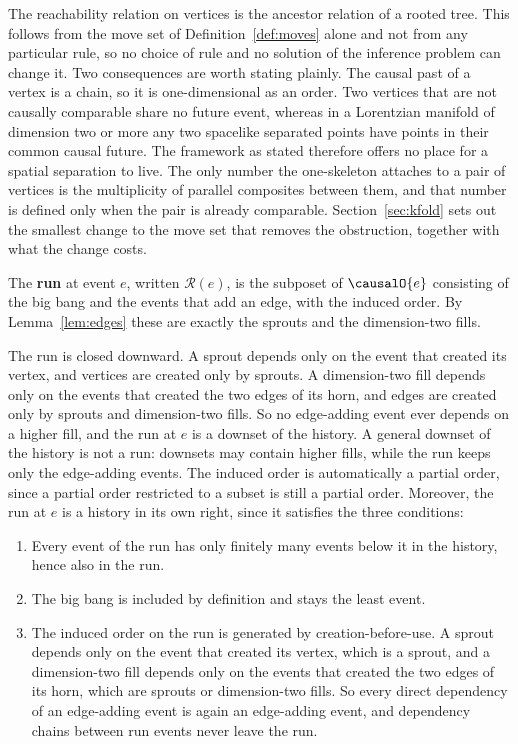 \begin{remark}
\label{rem:treecost}
The reachability relation on vertices is the ancestor relation of a rooted tree.
This follows from the move set of Definition~\ref{def:moves} alone and not from any particular rule, so no choice of rule and no solution of the inference problem can change it.
Two consequences are worth stating plainly.
The causal past of a vertex is a chain, so it is one-dimensional as an order.
Two vertices that are not causally comparable share no future event, whereas in a Lorentzian manifold of dimension two or more any two spacelike separated points have points in their common causal future.
The framework as stated therefore offers no place for a spatial separation to live.
The only number the one-skeleton attaches to a pair of vertices is the multiplicity of parallel composites between them, and that number is defined only when the pair is already comparable.
Section~\ref{sec:kfold} sets out the smallest change to the move set that removes the obstruction, together with what the change costs.
\end{remark}

\begin{definition}[Run]
\label{def:run}
The \textbf{run} at event $e$, written $\mathcal{R}(e)$, is the subposet of $\causalO{e}$ consisting of the big bang and the events that add an edge, with the induced order. By Lemma~\ref{lem:edges} these are exactly the sprouts and the dimension-two fills.
\end{definition}

The run is closed downward.
A sprout depends only on the event that created its vertex, and vertices are created only by sprouts.
A dimension-two fill depends only on the events that created the two edges of its horn, and edges are created only by sprouts and dimension-two fills.
So no edge-adding event ever depends on a higher fill, and the run at $e$ is a downset \citep{davey2002lattices} of the history.
A general downset of the history is not a run: downsets may contain higher fills, while the run keeps only the edge-adding events.
The induced order is automatically a partial order, since a partial order restricted to a subset is still a partial order.
Moreover, the run at $e$ is a history in its own right, since it satisfies the three conditions:

\begin{enumerate}
  \item Every event of the run has only finitely many events below it in the history, hence also in the run.
  \item The big bang is included by definition and stays the least event.
  \item The induced order on the run is generated by creation-before-use. A sprout depends only on the event that created its vertex, which is a sprout, and a dimension-two fill depends only on the events that created the two edges of its horn, which are sprouts or dimension-two fills. So every direct dependency of an edge-adding event is again an edge-adding event, and dependency chains between run events never leave the run.
\end{enumerate}

